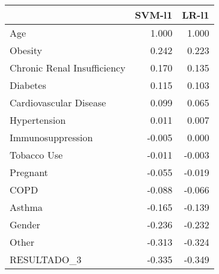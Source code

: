 \begin{tabular}{lrr}
\toprule
{} &  SVM-l1 &  LR-l1 \\
\midrule
Age                         &   1.000 &  1.000 \\
Obesity                     &   0.242 &  0.223 \\
Chronic Renal Insufficiency &   0.170 &  0.135 \\
Diabetes                    &   0.115 &  0.103 \\
Cardiovascular Disease      &   0.099 &  0.065 \\
Hypertension                &   0.011 &  0.007 \\
Immunosuppression           &  -0.005 &  0.000 \\
Tobacco Use                 &  -0.011 & -0.003 \\
Pregnant                    &  -0.055 & -0.019 \\
COPD                        &  -0.088 & -0.066 \\
Asthma                      &  -0.165 & -0.139 \\
Gender                      &  -0.236 & -0.232 \\
Other                       &  -0.313 & -0.324 \\
RESULTADO\_3                 &  -0.335 & -0.349 \\
\bottomrule
\end{tabular}

